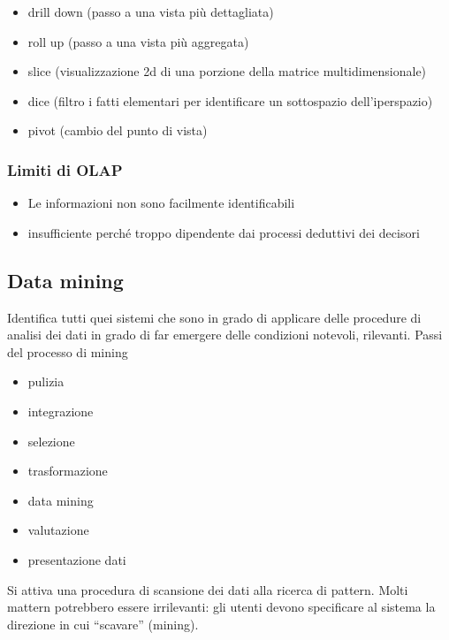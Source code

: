 \begin{itemize}

\item
  drill down (passo a una vista più dettagliata)
\item
  roll up (passo a una vista più aggregata)
\item
  slice (visualizzazione 2d di una porzione della matrice
  multidimensionale)
\item
  dice (filtro i fatti elementari per identificare un sottospazio
  dell'iperspazio)
\item
  pivot (cambio del punto di vista)
\end{itemize}

\subsubsection{Limiti di OLAP}\label{limiti-di-olap}

\begin{itemize}

\item
  Le informazioni non sono facilmente identificabili
\item
  insufficiente perché troppo dipendente dai processi deduttivi dei
  decisori
\end{itemize}

\subsection{Data mining}\label{data-mining}

Identifica tutti quei sistemi che sono in grado di applicare delle
procedure di analisi dei dati in grado di far emergere delle condizioni
notevoli, rilevanti. Passi del processo di mining

\begin{itemize}

\item
  pulizia
\item
  integrazione
\item
  selezione
\item
  trasformazione
\item
  data mining
\item
  valutazione
\item
  presentazione dati
\end{itemize}

Si attiva una procedura di scansione dei dati alla ricerca di pattern.
Molti mattern potrebbero essere irrilevanti: gli utenti devono
specificare al sistema la direzione in cui ``scavare'' (mining).

